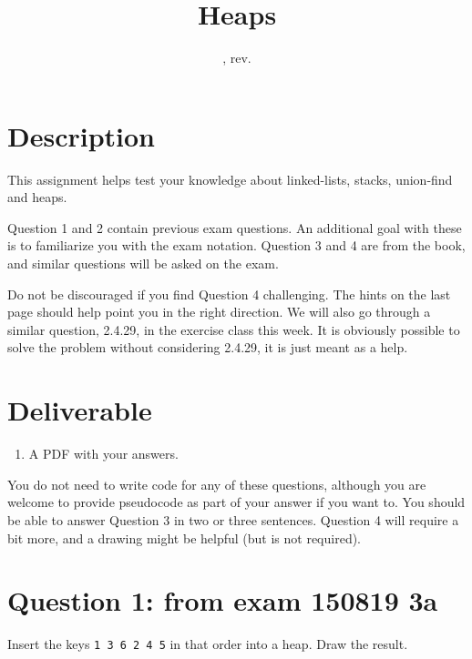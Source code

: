 \documentclass{tufte-handout}
\title{Heaps}
\author{}
\date{\GITAuthorDate, rev. \GITAbrHash}
\begin{document}
\maketitle

\section{\textbf{Description}}
  This assignment helps test your knowledge about linked-lists, stacks, union-find and heaps. 
  
  \medskip Question 1 and 2 contain previous exam questions. An additional goal with these is to familiarize you with the exam notation. Question 3 and 4 are from the book, and similar questions will be asked on the exam.
  
  \medskip Do not be discouraged if you find Question 4 challenging. The hints on the last page should help point you in the right direction. We will also go through a similar question, 2.4.29, in the exercise class this week. It is obviously possible to solve the problem without considering 2.4.29, it is just meant as a help.

\section{\textbf{Deliverable}}
\begin{enumerate}
\item A PDF with your answers.
\end{enumerate}

\medskip You do not need to write code for any of these questions, although you are welcome to provide pseudocode as part of your answer if you want to. You should be able to answer Question 3 in two or three sentences. Question 4 will require a bit more, and a drawing might be helpful (but is not required).


\section{\textbf{Question 1}: from exam 150819 3a}
Insert the keys {\tt 1 3 6 2 4 5} in that order into a heap. Draw the result.
\end{document}
